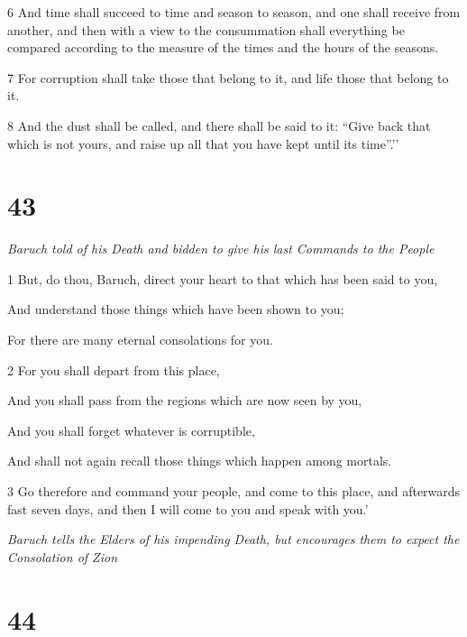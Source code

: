 \par 6 And time shall succeed to time and season to season, and one shall receive from another, and then with a view to the consummation shall everything be compared according to the measure of the times and the hours of the seasons. 

\par 7 For corruption shall take those that belong to it, and life those that belong to it. 

\par 8 And the dust shall be called, and there shall be said to it: “Give back that which is not yours, and raise up all that you have kept until its time”.’'


\chapter{43}

\par \textit{Baruch told of his Death and bidden to give his last Commands to the People}

\par 1 But, do thou, Baruch, direct your heart to that which has been said to you,

\par And understand those things which have been shown to you;

\par For there are many eternal consolations for you.

\par 2 For you shall depart from this place,

\par And you shall pass from the regions which are now seen by you,

\par And you shall forget whatever is corruptible,

\par And shall not again recall those things which happen among mortals.

\par 3 Go therefore and command your people, and come to this place, and afterwards fast seven days, and then I will come to you and speak with you.'

\par \textit{Baruch tells the Elders of his impending Death, but encourages them to expect the Consolation of Zion}

\chapter{44}

